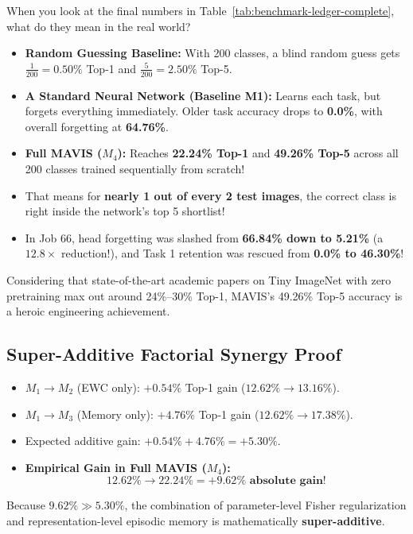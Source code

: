 \documentclass[11pt,a4paper]{article}
\begin{document}
\begin{callout}
When you look at the final numbers in Table~\ref{tab:benchmark-ledger-complete}, what do they mean in the real world?
\begin{itemize}[noitemsep]
    \item \textbf{Random Guessing Baseline:} With 200 classes, a blind random guess gets $\frac{1}{200} = \mathbf{0.50\%}$ Top-1 and $\frac{5}{200} = \mathbf{2.50\%}$ Top-5.
    \item \textbf{A Standard Neural Network (Baseline M1):} Learns each task, but forgets everything immediately. Older task accuracy drops to \textbf{0.0\%}, with overall forgetting at \textbf{64.76\%}.
    \item \textbf{Full MAVIS ($M_4$):} Reaches \textbf{22.24\% Top-1} and \textbf{49.26\% Top-5} across all 200 classes trained sequentially from scratch!
    \item That means for \textbf{nearly 1 out of every 2 test images}, the correct class is right inside the network's top 5 shortlist!
    \item In Job 66, head forgetting was slashed from \textbf{66.84\% down to 5.21\%} (a $12.8\times$ reduction!), and Task 1 retention was rescued from \textbf{0.0\% to 46.30\%}!
\end{itemize}
Considering that state-of-the-art academic papers on Tiny ImageNet with zero pretraining max out around 24\%--30\% Top-1, MAVIS's 49.26\% Top-5 accuracy is a heroic engineering achievement.
\end{callout}

\subsection{Super-Additive Factorial Synergy Proof}
\begin{itemize}[noitemsep]
    \item $M_1 \to M_2$ (EWC only): $+0.54\%$ Top-1 gain ($12.62\% \to 13.16\%$).
    \item $M_1 \to M_3$ (Memory only): $+4.76\%$ Top-1 gain ($12.62\% \to 17.38\%$).
    \item Expected additive gain: $+0.54\% + 4.76\% = +5.30\%$.
    \item \textbf{Empirical Gain in Full MAVIS ($M_4$):}
    \begin{equation}
    12.62\% \to 22.24\% = \mathbf{+9.62\% \text{ absolute gain!}}
    \end{equation}
\end{itemize}
Because $9.62\% \gg 5.30\%$, the combination of parameter-level Fisher regularization and representation-level episodic memory is mathematically \textbf{super-additive}.
\newpage
\end{document}
